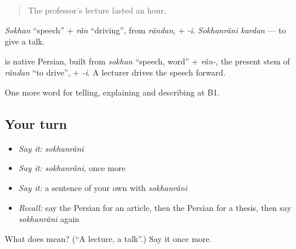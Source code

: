 \begin{quote}
The professor's lecture lasted an hour.
\end{quote}

\emph{Sokhan} \textquotedblleft{}speech\textquotedblright{} + \emph{rân} \textquotedblleft{}driving\textquotedblright{}, from \emph{rândan}, + \emph{-i}. \emph{Sokhanrâni kardan} — to give a talk.

\begin{cousinweb}
\textbf{} is native Persian, built from \emph{sokhan} \textquotedblleft{}speech, word\textquotedblright{} + \emph{rân-}, the present stem of \emph{rândan} \textquotedblleft{}to drive\textquotedblright{}, + \emph{-i}. A lecturer drives the speech forward.
\end{cousinweb}

\begin{grammarlens}[title={What you've built}]
One more word for telling, explaining and describing at B1.
\end{grammarlens}

\subsection*{Your turn}
\begin{itemize}
\raggedright
  \item \emph{Say it:} \emph{sokhanrâni}
  \item \emph{Say it:} \emph{sokhanrâni}, once more
  \item \emph{Say it:} a sentence of your own with \emph{sokhanrâni}
  \item \emph{Recall:} say the Persian for an article, then the Persian for a thesis, then say \emph{sokhanrâni} again
\end{itemize}

\begin{tcolorbox}[breakable,colback=teal!4,colframe=teal!35!black,title={Before you move on}]
What does  mean? (\textquotedblleft{}A lecture, a talk\textquotedblright{}.) Say it once more.
\end{tcolorbox}
